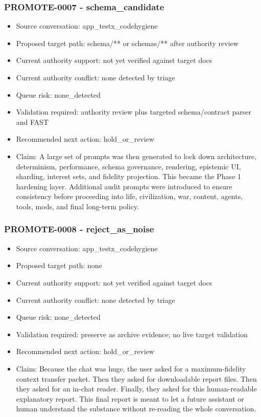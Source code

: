 \documentclass[11pt,a4paper]{report}
\begin{document}
\subsubsection{PROMOTE-0007 - schema\_candidate}

\begin{itemize}
\item Source conversation: app\_testx\_codehygiene
\item Proposed target path: schema/** or schemas/** after authority review
\item Current authority support: not yet verified against target docs
\item Current authority conflict: none detected by triage
\item Queue risk: none\_detected
\item Validation required: authority review plus targeted schema/contract parser and FAST
\item Recommended next action: hold\_or\_review
\item Claim: A large set of prompts was then generated to lock down architecture, determinism, performance, schema governance, rendering, epistemic UI, sharding, interest sets, and fidelity projection. This became the Phase 1 hardening layer. Additional audit prompts were introduced to ensure consistency before proceeding into life, civilization, war, content, agents, tools, mods, and final long-term policy.
\end{itemize}

\subsubsection{PROMOTE-0008 - reject\_as\_noise}

\begin{itemize}
\item Source conversation: app\_testx\_codehygiene
\item Proposed target path: none
\item Current authority support: not yet verified against target docs
\item Current authority conflict: none detected by triage
\item Queue risk: none\_detected
\item Validation required: preserve as archive evidence; no live target validation
\item Recommended next action: hold\_or\_review
\item Claim: Because the chat was huge, the user asked for a maximum-fidelity context transfer packet. Then they asked for downloadable report files. Then they asked for an in-chat reader. Finally, they asked for this human-readable explanatory report. This final report is meant to let a future assistant or human understand the substance without re-reading the whole conversation.
\end{itemize}
\end{document}
